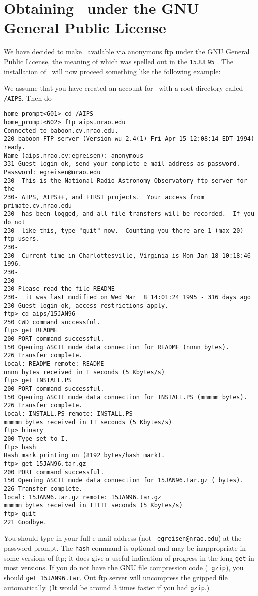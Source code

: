 \vfill
\eject

\section{Obtaining \AIPS\ under the GNU General Public License}

We have decided to make \AIPS\ available via anonymous ftp under the
GNU General Public License, the meaning of which was spelled out in
the {\tt 15JUL95} \hbox{\Aipsletter}.  The installation of \AIPS\ will
now proceed something like the following example:

We assume that you have created an account for \AIPS\ with a root
directory called \hbox{{\tt /AIPS}}.  Then do
\vskip -10pt
\begin{verbatim}
home_prompt<601> cd /AIPS
home_prompt<602> ftp aips.nrao.edu
Connected to baboon.cv.nrao.edu.
220 baboon FTP server (Version wu-2.4(1) Fri Apr 15 12:08:14 EDT 1994) ready.
Name (aips.nrao.cv:egreisen): anonymous
331 Guest login ok, send your complete e-mail address as password.
Password: egreisen@nrao.edu
230- This is the National Radio Astronomy Observatory ftp server for the
230- AIPS, AIPS++, and FIRST projects.  Your access from primate.cv.nrao.edu
230- has been logged, and all file transfers will be recorded.  If you do not
230- like this, type "quit" now.  Counting you there are 1 (max 20) ftp users.
230-
230- Current time in Charlottesville, Virginia is Mon Jan 18 10:18:46 1996.
230-
230-
230-Please read the file README
230-  it was last modified on Wed Mar  8 14:01:24 1995 - 316 days ago
230 Guest login ok, access restrictions apply.
ftp> cd aips/15JAN96
250 CWD command successful.
ftp> get README
200 PORT command successful.
150 Opening ASCII mode data connection for README (nnnn bytes).
226 Transfer complete.
local: README remote: README
nnnn bytes received in T seconds (5 Kbytes/s)
ftp> get INSTALL.PS
200 PORT command successful.
150 Opening ASCII mode data connection for INSTALL.PS (mmmmm bytes).
226 Transfer complete.
local: INSTALL.PS remote: INSTALL.PS
mmmmm bytes received in TT seconds (5 Kbytes/s)
ftp> binary
200 Type set to I.
ftp> hash
Hash mark printing on (8192 bytes/hash mark).
ftp> get 15JAN96.tar.gz
200 PORT command successful.
150 Opening ASCII mode data connection for 15JAN96.tar.gz ( bytes).
226 Transfer complete.
local: 15JAN96.tar.gz remote: 15JAN96.tar.gz
mmmmm bytes received in TTTTT seconds (5 Kbytes/s)
ftp> quit
221 Goodbye.
\end{verbatim}
\vskip -10pt
You should type in your full e-mail address (not {\tt
egreisen@nrao.edu}) at the password prompt.  The {\tt hash} command is
optional and may be inappropriate in some versions of ftp; it does
give a useful indication of progress in the long {\tt get} in most
versions.  If you do not have the GNU file compression code ({\tt
gzip}), you should {\tt get 15JAN96.tar}.  Out ftp server will
uncompress the gzipped file automatically.  (It would be around 3
times faster if you had {\tt gzip}.)

